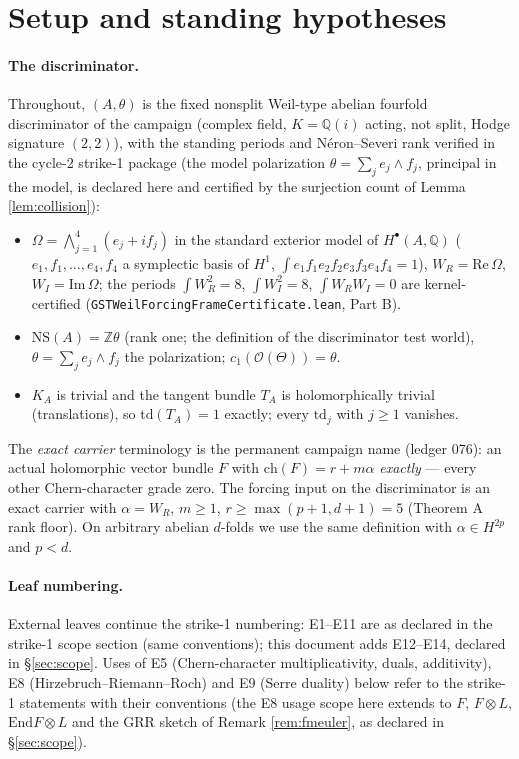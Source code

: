 \documentclass[11pt]{article}
\begin{document}
\section{Setup and standing hypotheses}\label{sec:setup}

\paragraph{The discriminator.} Throughout, $(A,\theta)$ is the fixed nonsplit Weil-type abelian fourfold
discriminator of the campaign (complex field, $K=\mathbb{Q}(i)$ acting, not split, Hodge signature $(2,2)$),
with the standing periods and N\'eron--Severi rank verified in the cycle-2 strike-1 package (the model
polarization $\theta=\sum_j e_j\wedge f_j$, principal in the model, is declared here and certified by the
surjection count of Lemma \ref{lem:collision}):
\begin{itemize}[itemsep=1pt]
\item[(D1)] $\Omega=\bigwedge_{j=1}^4(e_j+i f_j)$ in the standard exterior model of
$H^\bullet(A,\mathbb{Q})$ ($e_1,f_1,\dots,e_4,f_4$ a symplectic basis of $H^1$,
$\int e_1f_1e_2f_2e_3f_3e_4f_4=1$), $W_R=\mathrm{Re}\,\Omega$, $W_I=\mathrm{Im}\,\Omega$;
the periods $\int W_R^2=8$, $\int W_I^2=8$, $\int W_R W_I=0$ are kernel-certified
(\texttt{GSTWeilForcingFrameCertificate.lean}, Part B).
\item[(D2)] $\mathrm{NS}(A)=\mathbb{Z}\theta$ (rank one; the definition of the discriminator test world),
$\theta=\sum_j e_j\wedge f_j$ the polarization; $c_1(\mathcal{O}(\Theta))=\theta$.
\item[(D3)] $K_A$ is trivial and the tangent bundle $T_A$ is holomorphically trivial (translations), so
$\mathrm{td}(T_A)=1$ exactly; every $\mathrm{td}_j$ with $j\ge1$ vanishes.
\end{itemize}
The \emph{exact carrier} terminology is the permanent campaign name (ledger 076): an actual holomorphic
vector bundle $F$ with $\mathrm{ch}(F)=r+m\alpha$ \emph{exactly} --- every other Chern-character grade
zero. The forcing input on the discriminator is an exact carrier with $\alpha=W_R$, $m\ge1$,
$r\ge\max(p+1,d+1)=5$ (Theorem A rank floor). On arbitrary abelian $d$-folds we use the same
definition with $\alpha\in H^{2p}$ and $p<d$.

\paragraph{Leaf numbering.} External leaves continue the strike-1 numbering: E1--E11 are as declared in
the strike-1 scope section (same conventions); this document adds E12--E14, declared in
\S\ref{sec:scope}. Uses of E5 (Chern-character multiplicativity, duals, additivity), E8
(Hirzebruch--Riemann--Roch) and E9 (Serre duality) below refer to the strike-1 statements with their
conventions (the E8 usage scope here extends to $F$, $F\otimes L$, $\mathrm{End}F\otimes L$ and the
GRR sketch of Remark \ref{rem:fmeuler}, as declared in \S\ref{sec:scope}).
\end{document}
